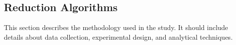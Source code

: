 \subsection{Reduction Algorithms}
\label{subsec:reduction}

This section describes the methodology used in the study. It should include details about data collection, experimental design, and analytical techniques.


